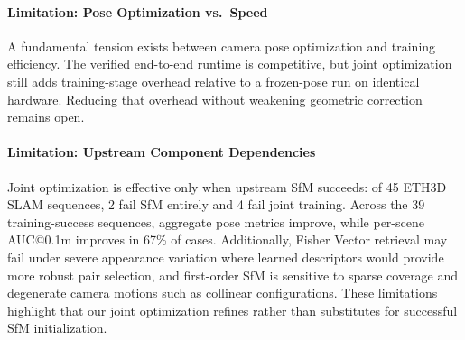 \documentclass[sigconf]{acmart}
\begin{document}
\paragraph{Limitation: Pose Optimization vs.\ Speed}
A fundamental tension exists between camera pose optimization and training efficiency. The verified end-to-end runtime is competitive, but joint optimization still adds training-stage overhead relative to a frozen-pose run on identical hardware. Reducing that overhead without weakening geometric correction remains open.

\paragraph{Limitation: Upstream Component Dependencies}
Joint optimization is effective only when upstream SfM succeeds: of 45 ETH3D SLAM sequences, 2 fail SfM entirely and 4 fail joint training. Across the 39 training-success sequences, aggregate pose metrics improve, while per-scene AUC@0.1m improves in 67\% of cases. Additionally, Fisher Vector retrieval may fail under severe appearance variation where learned descriptors would provide more robust pair selection, and first-order SfM is sensitive to sparse coverage and degenerate camera motions such as collinear configurations. These limitations highlight that our joint optimization refines rather than substitutes for successful SfM initialization.



\end{document}
